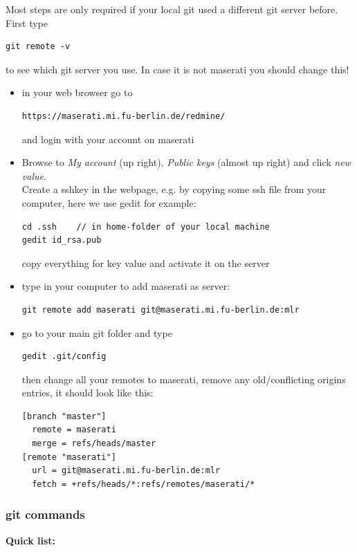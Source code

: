 Most steps are only required if your local git used a different git
server before.
\\
First type
\begin{verbatim}
git remote -v
\end{verbatim}
to see which git server you use. In case it is not maserati you should
change this!

\begin{itemize}
\item in your web browser go to
\begin{verbatim}
https://maserati.mi.fu-berlin.de/redmine/
\end{verbatim}
and login with your account on maserati

\item  Browse to \textit{My account} (up right), \textit{Public
keys} (almost up right) and click \textit{new value}.  \\
Create a sshkey in the webpage, e.g. by copying some ssh file from your
computer, here we use gedit for example:
\begin{verbatim}
cd .ssh    // in home-folder of your local machine
gedit id_rsa.pub
\end{verbatim}
copy everything for key value and activate it on the server
\item type in your computer to add maserati as server:
\begin{verbatim}
git remote add maserati git@maserati.mi.fu-berlin.de:mlr
\end{verbatim}
\item
go to your main git folder and type
\begin{verbatim}
gedit .git/config
\end{verbatim}
then change all your remotes to maserati, remove any old/conflicting
origins entries, it should look like this:
\begin{verbatim}
[branch "master"]
  remote = maserati
  merge = refs/heads/master
[remote "maserati"]
  url = git@maserati.mi.fu-berlin.de:mlr
  fetch = +refs/heads/*:refs/remotes/maserati/*
\end{verbatim}
\end{itemize}





\subsubsection{git commands}


\textbf{Quick list:}

